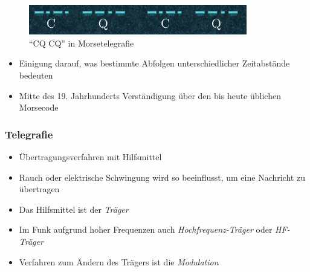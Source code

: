 \begin{frame}
\begin{figure}
    \includegraphics[width=0.85\textwidth]{foto/216}
    \caption{\scriptsize \enquote{CQ CQ} in Morsetelegrafie}
    \label{n_cqcq_horiz}
\end{figure}
\begin{itemize}
  \item Einigung darauf, was bestimmte Abfolgen unterschiedlicher Zeitabstände bedeuten
  \item Mitte des 19. Jahrhunderts Verständigung über den bis heute üblichen Morsecode
  \end{itemize}

\end{frame}

\begin{frame}
\frametitle{Telegrafie}
\begin{itemize}
  \item Übertragungsverfahren mit Hilfsmittel
  \item Rauch oder elektrische Schwingung wird so beeinflusst, um eine Nachricht zu übertragen
  \item Das Hilfsmittel ist der \emph{Träger}
  \item Im Funk aufgrund hoher Frequenzen auch \emph{Hochfrequenz-Träger} oder \emph{HF-Träger}
  \item Verfahren zum Ändern des Trägers ist die \emph{Modulation}
  \end{itemize}

\end{frame}

\begin{frame}
\end{frame}

